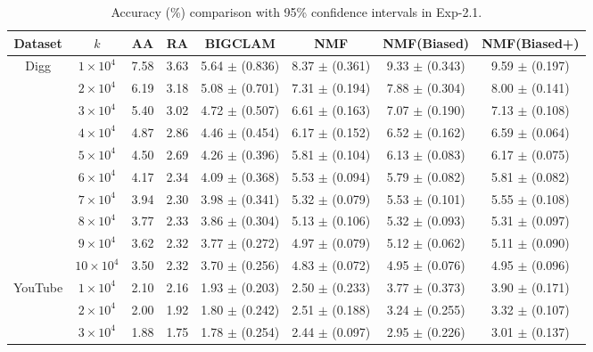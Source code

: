 \documentclass[10pt,journal,compsoc]{IEEEtran}
\newcommand{\NMF}{{\sf NMF}\xspace }
\newcommand{\Biased}{{\sf NMF(Biased)}\xspace}
\newcommand{\Aa}{{\sf AA}\xspace }
\newcommand{\RA}{{\sf RA}\xspace }
\newcommand{\BIGCLAM}{{\sf BIGCLAM}\xspace}
\newcommand{\Digg}{{\sf Digg}\xspace}
\newcommand{\YouTube}{{\sf YouTube}\xspace}
\newcommand{\Biasedp}{{\sf NMF(Biased+)}\xspace}
\begin{document}
\begin{table}
\caption{Accuracy (\%) comparison with 95\% confidence intervals in Exp-2.1.}
\label{tab_accuracy_3}
\vspace{-2ex}
\centering
\newcommand{\tabincell}[2]{\begin{tabular}{@{}#1@{}}#2\end{tabular}}
\begin{tabular}{c|c|c|c|c|c|c|c}
\hline \hline Dataset  & $k$ & \Aa & \RA & \BIGCLAM & \NMF & \Biased & \Biasedp  \\
\hline
\multirow{10}{*}{\Digg}
 & $1 \times 10^4 $ & 7.58 & 3.63 & 5.64 $\pm$ (0.836) & 8.37 $\pm$ (0.361) & 9.33 $\pm$ (0.343) & 9.59 $\pm$ (0.197) \\
 & $2 \times 10^4 $ & 6.19 & 3.18 & 5.08 $\pm$ (0.701) & 7.31 $\pm$ (0.194) & 7.88 $\pm$ (0.304) & 8.00 $\pm$ (0.141)  \\
 & $3 \times 10^4 $ & 5.40 & 3.02 & 4.72 $\pm$ (0.507) & 6.61 $\pm$ (0.163) & 7.07 $\pm$ (0.190) & 7.13 $\pm$ (0.108)  \\
 & $4 \times 10^4 $ & 4.87 & 2.86 & 4.46 $\pm$ (0.454) & 6.17 $\pm$ (0.152) & 6.52 $\pm$ (0.162) & 6.59 $\pm$ (0.064) \\
 & $5 \times 10^4 $ & 4.50 & 2.69 & 4.26 $\pm$ (0.396) & 5.81 $\pm$ (0.104) & 6.13 $\pm$ (0.083) & 6.17 $\pm$ (0.075)  \\
 & $6 \times 10^4 $ & 4.17 & 2.34 & 4.09 $\pm$ (0.368) & 5.53 $\pm$ (0.094) & 5.79 $\pm$ (0.082) & 5.81 $\pm$ (0.082)  \\
 & $7 \times 10^4 $ & 3.94 & 2.30 & 3.98 $\pm$ (0.341) & 5.32 $\pm$ (0.079) & 5.53 $\pm$ (0.101) & 5.55 $\pm$ (0.108)  \\
 & $8 \times 10^4 $ & 3.77 & 2.33 & 3.86 $\pm$ (0.304) & 5.13 $\pm$ (0.106) & 5.32 $\pm$ (0.093) & 5.31 $\pm$ (0.097)  \\
 & $9 \times 10^4 $ & 3.62 & 2.32 & 3.77 $\pm$ (0.272) & 4.97 $\pm$ (0.079) & 5.12 $\pm$ (0.062) & 5.11 $\pm$ (0.090)  \\
 & $10 \times 10^4 $ & 3.50 & 2.32 & 3.70 $\pm$ (0.256) & 4.83 $\pm$ (0.072) & 4.95 $\pm$ (0.076) & 4.95 $\pm$ (0.096)  \\
\hline
\multirow{10}{*}{\YouTube}
 & $1 \times 10^4 $ & 2.10 & 2.16 & 1.93 $\pm$ (0.203) & 2.50 $\pm$ (0.233) & 3.77 $\pm$ (0.373) & 3.90 $\pm$ (0.171)  \\
 & $2 \times 10^4 $ & 2.00 & 1.92 & 1.80 $\pm$ (0.242) & 2.51 $\pm$ (0.188) & 3.24 $\pm$ (0.255) & 3.32 $\pm$ (0.107)  \\
 & $3 \times 10^4 $ & 1.88 & 1.75 & 1.78 $\pm$ (0.254) & 2.44 $\pm$ (0.097) & 2.95 $\pm$ (0.226) & 3.01 $\pm$ (0.137)  \\

\end{tabular}
\end{table}
\end{document}

